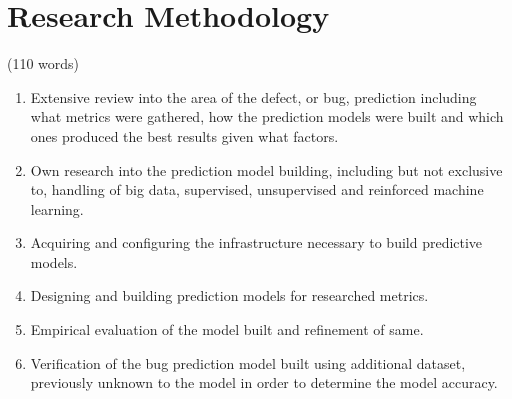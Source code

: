 \chapter{Research Methodology}
(110 words)
\begin{enumerate}
\item Extensive review into the area of the defect, or bug, prediction including what metrics were gathered, how the prediction models were built and which ones produced the best results given what factors.
\item Own research into the prediction model building, including but not exclusive to, handling of big data, supervised, unsupervised and reinforced machine learning.
\item Acquiring and configuring the infrastructure necessary to build predictive models.
\item Designing and building prediction models for researched metrics.
\item Empirical evaluation of the model built and refinement of same.
\item Verification of the bug prediction model built using additional dataset, previously unknown to the model in order to determine the model accuracy.
\end{enumerate}